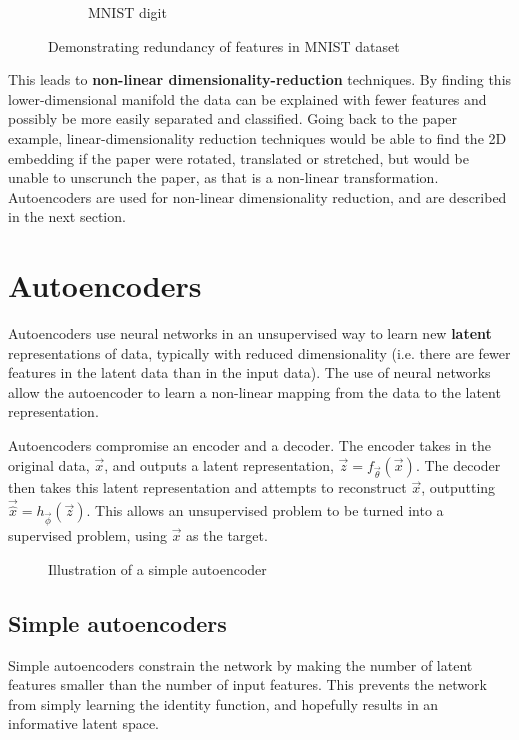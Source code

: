 \begin{figure}[H]
\begin{subfigure}[b]{0.4\linewidth}
    \caption{MNIST digit}
  \end{subfigure}
  \caption{Demonstrating redundancy of features in MNIST dataset}
  \label{fig:digit}
\end{figure}

This leads to \textbf{non-linear dimensionality-reduction} techniques. By finding this lower-dimensional
manifold the data can be explained with fewer features and possibly be more easily separated and classified. Going back to the paper example,
linear-dimensionality reduction techniques would be able to find the 2D embedding if the paper were 
rotated, translated or stretched, but would be unable to unscrunch the paper, as that is a non-linear transformation. Autoencoders are 
used for non-linear dimensionality reduction, and are described in the next section.

\section{Autoencoders}

Autoencoders use neural networks in an unsupervised way to learn new \textbf{latent} representations of data, typically with reduced 
dimensionality (i.e. there are fewer features in the latent data than in the input data). The use of neural networks allow the autoencoder 
to learn a non-linear mapping from the data to the latent representation.

Autoencoders compromise an encoder and a decoder. The encoder takes in the original data, $\vec{x}$, 
and outputs a latent representation, $\vec{z} = f_{\vec{\theta}}(\vec{x})$. The decoder then takes this latent representation and 
attempts to reconstruct $\vec{x}$, outputting $\vec{\hat{x}} = h_{\vec{\phi}}(\vec{z})$. This allows an unsupervised problem to be turned 
into a supervised problem, using $\vec{x}$ as the target.
\begin{figure}[H]
  \begin{center}
      \scalebox{.6}{}
      \caption{Illustration of a simple autoencoder}
      \label{fig:illustration_autoencoder}
  \end{center}
\end{figure}

\subsection{Simple autoencoders}

Simple autoencoders constrain the network by making the number of latent features smaller than the number of input
features. This prevents the network from simply learning the identity function, and hopefully results in an informative latent space.

